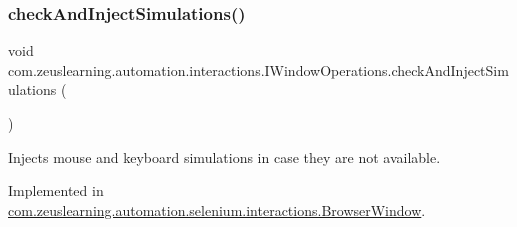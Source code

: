 \hypertarget{interfacecom_1_1zeuslearning_1_1automation_1_1interactions_1_1IWindowOperations_a6f5627a3145238d63f310c22d2e3c6e5}{}\label{interfacecom_1_1zeuslearning_1_1automation_1_1interactions_1_1IWindowOperations_a6f5627a3145238d63f310c22d2e3c6e5} 
\subsubsection{\texorpdfstring{check\+And\+Inject\+Simulations()}{checkAndInjectSimulations()}}
{\footnotesize\ttfamily void com.\+zeuslearning.\+automation.\+interactions.\+I\+Window\+Operations.\+check\+And\+Inject\+Simulations (\begin{DoxyParamCaption}{ }\end{DoxyParamCaption})}

Injects mouse and keyboard simulations in case they are not available. 

Implemented in \hyperlink{classcom_1_1zeuslearning_1_1automation_1_1selenium_1_1interactions_1_1BrowserWindow_a501c3085d022ec5cd5ced4631c46eaae}{com.\+zeuslearning.\+automation.\+selenium.\+interactions.\+Browser\+Window}.

